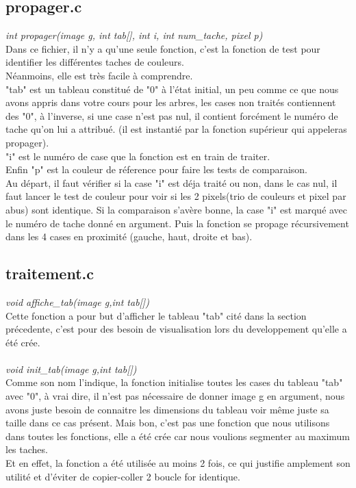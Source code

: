 \documentclass[12pt, letterpaper]{article}
\begin{document}
\subsection{propager.c}
\textit{int propager(image g, int tab[], int i, int num\_tache, pixel p)}\\
Dans ce fichier, il n'y a qu'une seule fonction, c'est la fonction de test pour identifier les différentes 
taches de couleurs.\\
Néanmoins, elle est très facile à comprendre.\\
"tab" est un tableau constitué de "0" à l'état initial, un peu comme ce que nous avons appris dans votre cours 
pour les arbres, les cases non traités contiennent des "0", à l'inverse, si une case n'est pas nul, 
il contient forcément le numéro de tache qu'on lui a attribué. (il est instantié par la fonction supérieur qui appeleras propager).\\
"i" est le numéro de case que la fonction est en train de traiter.\\
Enfin "p" est la couleur de réference pour faire les tests de comparaison.\\
Au départ, il faut vérifier si la case "i" est déja traité ou non, dans le cas nul, 
il faut lancer le test de couleur pour voir si les 2 pixels(trio de couleurs et pixel par abus) sont identique.
Si la comparaison s'avère bonne, la case "i" est marqué avec le numéro de tache donné en argument.
Puis la fonction se propage récursivement dans les 4 cases en proximité (gauche, haut, droite et bas).
\\
\subsection{traitement.c}

\textit{void affiche\_tab(image g,int tab[])}\\
Cette fonction a pour but d'afficher le tableau "tab" cité dans la section précedente, c'est pour des 
besoin de visualisation lors du developpement qu'elle a été crée.
\\\\
\textit{void init\_tab(image g,int tab[])}\\
Comme son nom l'indique, la fonction initialise toutes les cases du tableau "tab" avec "0", 
à vrai dire, il n'est pas nécessaire de donner image g en argument, nous avons juste besoin de connaitre les 
dimensions du tableau voir même juste sa taille dans ce cas présent. Mais bon, c'est pas une fonction que 
nous utilisons dans toutes les fonctions, elle a été crée car nous voulions segmenter au maximum les taches. \\
Et en effet, la fonction a été utilisée au moins 2 fois, ce qui justifie amplement son utilité et d'éviter de copier-coller 2 boucle for identique.
\\
\textit{}\\
\\
\textit{}\\
\\
\textit{}\\
\\
\end{document}

